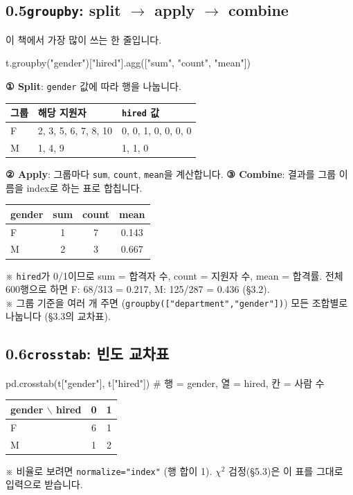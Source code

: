 \documentclass[11pt,a4paper]{article}
\newcommand{\code}[1]{\texttt{#1}}
\newcommand{\aside}[1]{{\footnotesize\color{black!65}#1}}
\begin{document}
\subsection*{0.5\quad \code{groupby}: split $\to$ apply $\to$ combine}
이 책에서 가장 많이 쓰는 한 줄입니다.
\begin{codebox}
t.groupby("gender")["hired"].agg(["sum", "count", "mean"])
\end{codebox}
\textbf{① Split}: \code{gender} 값에 따라 행을 나눕니다.
\begin{center}\small
\begin{tabular}{@{}l l l@{}}
\toprule
그룹 & 해당 지원자 & \code{hired} 값 \\
\midrule
F & 2, 3, 5, 6, 7, 8, 10 & 0, 0, 1, 0, 0, 0, 0 \\
M & 1, 4, 9 & 1, 1, 0 \\
\bottomrule
\end{tabular}
\end{center}
\textbf{② Apply}: 그룹마다 \code{sum}, \code{count}, \code{mean}을 계산합니다. \quad
\textbf{③ Combine}: 결과를 그룹 이름을 index로 하는 표로 합칩니다.
\begin{center}\small
\begin{tabular}{@{}l c c c@{}}
\toprule
gender & sum & count & mean \\
\midrule
F & 1 & 7 & 0.143 \\
M & 2 & 3 & 0.667 \\
\bottomrule
\end{tabular}
\end{center}
\aside{※ \code{hired}가 0/1이므로 sum = 합격자 수, count = 지원자 수, mean = 합격률. 전체 600행으로 하면 F: 68/313 = 0.217, M: 125/287 = 0.436 (\S3.2).}\\
\aside{※ 그룹 기준을 여러 개 주면 (\code{groupby(["department","gender"])}) 모든 조합별로 나눕니다 (\S3.3의 교차표).}

\subsection*{0.6\quad \code{crosstab}: 빈도 교차표}
\begin{codebox}
pd.crosstab(t["gender"], t["hired"]) \hfill \# 행 = gender, 열 = hired, 칸 = 사람 수
\end{codebox}
\begin{center}\small
\begin{tabular}{@{}l c c@{}}
\toprule
gender $\backslash$ hired & 0 & 1 \\
\midrule
F & 6 & 1 \\
M & 1 & 2 \\
\bottomrule
\end{tabular}
\end{center}
\aside{※ 비율로 보려면 \code{normalize="index"} (행 합이 1). $\chi^2$ 검정(\S5.3)은 이 표를 그대로 입력으로 받습니다.}
\end{document}
